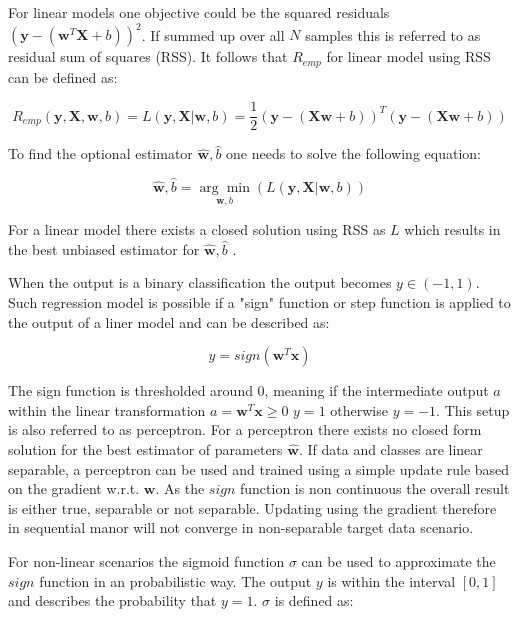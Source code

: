 \documentclass[../main.tex]{subfiles}
\begin{document}
For linear models one objective could be the squared residuals $(\mathbf{y} - (\mathbf{w}^T\mathbf{X} + b))^2$. If summed up over all $N$ samples this is referred to as residual sum of squares (RSS). It follows that $R_{emp}$ for linear model using RSS can be defined as:

\begin{equation}
    R_{emp}(\mathbf{y}, \mathbf{X}, \mathbf{w}, b)=L(\mathbf{y}, \mathbf{X} | \mathbf{w}, b)=\frac{1}{2}(\mathbf{y}-(\mathbf{X}\mathbf{w}+b))^T(\mathbf{y}-(\mathbf{X}\mathbf{w}+b))
\end{equation}

To find the optional estimator $\hat{\mathbf{w}}, \hat{b}$ one needs to solve the following equation:

\begin{equation}
    \hat{\mathbf{w}}, \hat{b}=\underset{\mathbf{w}, b}{\arg\min}(L(\mathbf{y}, \mathbf{X} | \mathbf{w}, b))
\end{equation}

For a linear model there exists a closed solution using RSS as $L$ which results in the best unbiased estimator for $\hat{\mathbf{w}}, \hat{b}$ \cite[p.~146]{bishop_pattern_2006}. %

When the output is a binary classification the output becomes $y \in (-1,1)$. Such regression model is possible if a "sign" function or step function is applied to the output of a liner model and can be described as:

\begin{equation}
    y=sign(\mathbf{w}^T\mathbf{x})
\end{equation}

The sign function is thresholded around 0, meaning if the intermediate output $a$ within the linear transformation $a=\mathbf{w}^T\mathbf{x} \ge 0$ $y=1$ otherwise $y=-1$. This setup is also referred to as perceptron. For a perceptron there exists no closed form solution for the best estimator of parameters $\hat{\mathbf{w}}$. If data and classes are linear separable, a perceptron can be used and trained using a simple update rule based on the gradient w.r.t. $\mathbf{w}$. As the $sign$ function is non continuous the overall result is either true, separable or not separable. Updating using the gradient therefore in sequential manor will not converge in non-separable target data scenario.

 \label{par:logreg}

For non-linear scenarios the sigmoid function $\sigma$ can be used to approximate the $sign$ function in an probabilistic way. The output $y$ is within the interval $[0, 1]$ and describes the probability that $y=1$. $\sigma$ is defined as:
\end{document}
